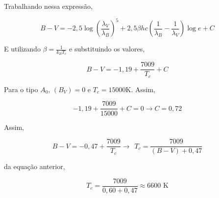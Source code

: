 \documentclass[11pt]{article}
\begin{document}
\begin{pproblem}
\begin{pssolution*}{}{}
\begin{alternativas}
        Trabalhando nessa expressão, 

        \[B-V = -2,5\log\left(\frac{\lambda_V}{\lambda_B}\right)^5 + 2,5 \beta hc\left(\frac{1}{\lambda_B}-\frac{1}{\lambda_V}\right)\log e + C\]

        E utilizando \(\beta = \frac{1}{k_B T_c}\) e substituindo os valores, 

        \[B-V = -1,19 + \frac{7009}{T_c}+C\]

        Para o tipo \(A_0\), \((B_V)=0\) e \(T_c = 15000\)K. Assim, 

        \[-1,19 + \frac{7009}{15000} + C = 0 \rightarrow C = 0,72\]

        Assim, 

        \[B-V = -0,47 + \frac{7009}{T_c} \rightarrow \ \ \boxed{T_c = \frac{7009}{(B-V) + 0,47}}\]

        \item da equação anterior, 
        
        \[\boxed{T_c = \frac{7009}{0,60 + 0,47} \approx 6600 \text{ K}}\]
    \end{alternativas}    

\end{pssolution*}
\end{pproblem}


\newpage
\end{document}
